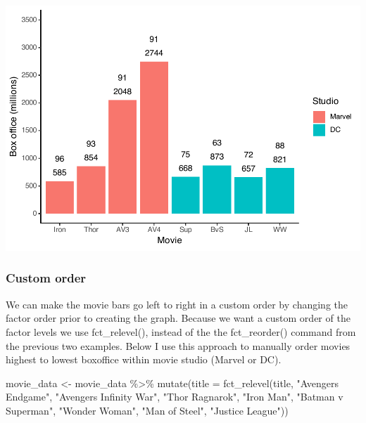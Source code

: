 \documentclass[
]{krantz}
\makeatletter
\newenvironment{Shaded}{\begin{snugshade}}{\end{snugshade}}
\newcommand{\AttributeTok}[1]{\textcolor[rgb]{0.61,0.61,0.61}{#1}}
\newcommand{\FunctionTok}[1]{\textcolor[rgb]{0,0,0}{#1}}
\newcommand{\NormalTok}[1]{#1}
\newcommand{\OtherTok}[1]{\textcolor[rgb]{0.37,0.37,0.37}{#1}}
\newcommand{\SpecialCharTok}[1]{\textcolor[rgb]{0,0,0}{#1}}
\newcommand{\StringTok}[1]{\textcolor[rgb]{0.5,0.5,0.5}{#1}}
\newenvironment{kframe}{%
\medskip{}
\setlength{\fboxsep}{.8em}
 \def\at@end@of@kframe{}%
 \ifinner\ifhmode%
  \def\at@end@of@kframe{\end{minipage}}%
  \begin{minipage}{\columnwidth}%
 \fi\fi%
 \def\FrameCommand##1{\hskip\@totalleftmargin \hskip-\fboxsep
 \colorbox{shadecolor}{##1}\hskip-\fboxsep
     \hskip-\linewidth \hskip-\@totalleftmargin \hskip\columnwidth}%
 \MakeFramed {\advance\hsize-\width
   \@totalleftmargin\z@ \linewidth\hsize
   \@setminipage}}%
 {\par\unskip\endMakeFramed%
 \at@end@of@kframe}
\renewenvironment{Shaded}{\begin{kframe}}{\end{kframe}}
\makeatother
\begin{document}
\includegraphics[width=0.65\linewidth]{bookdown_files/figure-latex/unnamed-chunk-127-1}

\hypertarget{custom-order}{%
\subsubsection{Custom order}\label{custom-order}}

We can make the movie bars go left to right in a custom order by changing the factor order prior to creating the graph. Because we want a custom order of the factor levels we use fct\_relevel(), instead of the the fct\_reorder() command from the previous two examples. Below I use this approach to manually order movies highest to lowest boxoffice within movie studio (Marvel or DC).

\begin{Shaded}
\begin{Highlighting}[]
\NormalTok{movie\_data }\OtherTok{\textless{}{-}}\NormalTok{ movie\_data }\SpecialCharTok{\%\textgreater{}\%} 
  \FunctionTok{mutate}\NormalTok{(}\AttributeTok{title =} \FunctionTok{fct\_relevel}\NormalTok{(title,}
                             \StringTok{"Avengers Endgame"}\NormalTok{,}
                             \StringTok{"Avengers Infinity War"}\NormalTok{,}
                             \StringTok{"Thor Ragnarok"}\NormalTok{,}
                             \StringTok{"Iron Man"}\NormalTok{,}
                             \StringTok{"Batman v Superman"}\NormalTok{,}
                             \StringTok{"Wonder Woman"}\NormalTok{,}
                             \StringTok{"Man of Steel"}\NormalTok{,}
                             \StringTok{"Justice League"}\NormalTok{))}
\end{Highlighting}
\end{Shaded}
\end{document}
